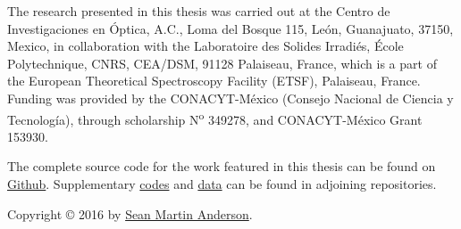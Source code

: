\begin{titlingpage*}

\let\cleardoublepage\clearpage

\null
\vfill
\parbox{0.7\textwidth}{
The research presented in this thesis was carried out at the Centro de
Investigaciones en \'Optica, A.C., Loma del Bosque 115, Le\'on, Guanajuato,
37150, Mexico, in collaboration with the Laboratoire des Solides Irradi\'es,
\'Ecole Polytechnique, CNRS, CEA/DSM, 91128 Palaiseau, France, which is a part
of the European Theoretical Spectroscopy Facility (ETSF), Palaiseau, France.
Funding was provided by the CONACYT-M\'exico (Consejo Nacional de Ciencia y
Tecnolog\'ia), through scholarship N\textsuperscript{o} 349278, and
CONACYT-M\'exico Grant 153930.

\vspace{1cm}

The complete source code for the work featured in this thesis can be found on
\href{https://github.com/roguephysicist/phd-thesis}{Github}. Supplementary
\href{https://github.com/roguephysicist/SHGYield}{codes} and
\href{https://github.com/roguephysicist/shg-si-surfaces}{data} can be found in
adjoining repositories.

\vspace{1cm}

Copyright {\copyright{}} 2016 by 
\href{mailto:sean.martin.anderson@gmail.com}{Sean Martin Anderson}.
}

\end{titlingpage*}
